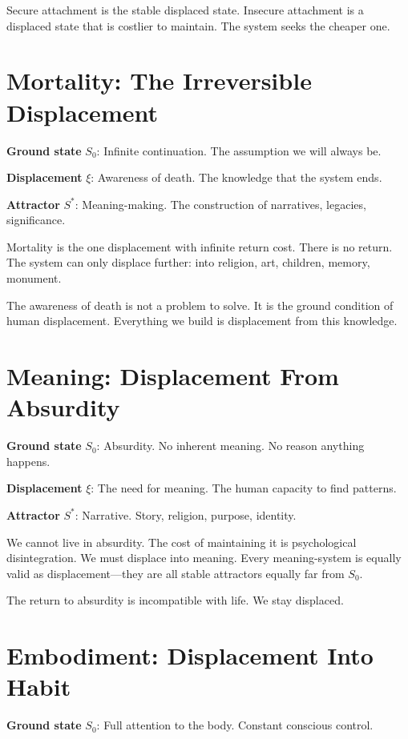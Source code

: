 \documentclass[12pt]{article}
\theoremstyle{definition}
\theoremstyle{remark}
\begin{document}
Secure attachment is the stable displaced state. Insecure attachment is a displaced state that is costlier to maintain. The system seeks the cheaper one.

\section{Mortality: The Irreversible Displacement}

\textbf{Ground state} $S_0$: Infinite continuation. The assumption we will always be.

\textbf{Displacement} $\xi$: Awareness of death. The knowledge that the system ends.

\textbf{Attractor} $S^*$: Meaning-making. The construction of narratives, legacies, significance.

Mortality is the one displacement with infinite return cost. There is no return. The system can only displace further: into religion, art, children, memory, monument.

The awareness of death is not a problem to solve. It is the ground condition of human displacement. Everything we build is displacement from this knowledge.

\section{Meaning: Displacement From Absurdity}

\textbf{Ground state} $S_0$: Absurdity. No inherent meaning. No reason anything happens.

\textbf{Displacement} $\xi$: The need for meaning. The human capacity to find patterns.

\textbf{Attractor} $S^*$: Narrative. Story, religion, purpose, identity.

We cannot live in absurdity. The cost of maintaining it is psychological disintegration. We must displace into meaning. Every meaning-system is equally valid as displacement—they are all stable attractors equally far from $S_0$.

The return to absurdity is incompatible with life. We stay displaced.

\section{Embodiment: Displacement Into Habit}

\textbf{Ground state} $S_0$: Full attention to the body. Constant conscious control.
\end{document}
